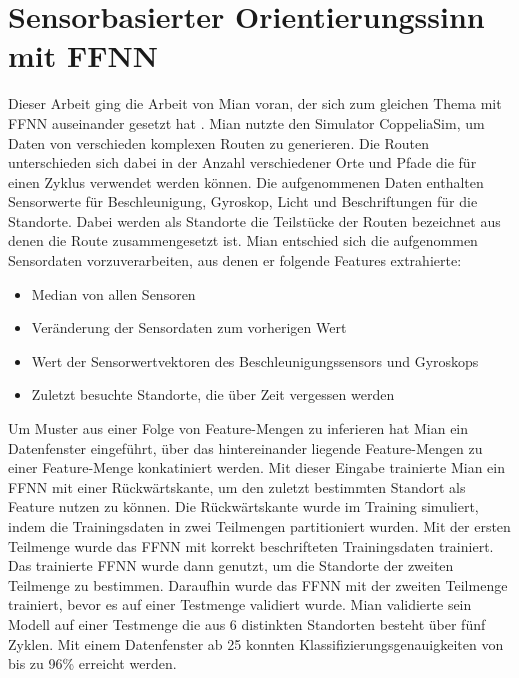 \section{Sensorbasierter Orientierungssinn mit FFNN}
Dieser Arbeit ging die Arbeit von Mian voran, der sich zum gleichen Thema mit FFNN auseinander gesetzt hat \cite{naveedThesis}.
Mian nutzte den Simulator CoppeliaSim, um Daten von verschieden komplexen Routen zu generieren.
Die Routen unterschieden sich dabei in der Anzahl verschiedener Orte und Pfade die für einen Zyklus verwendet werden können.
Die aufgenommenen Daten enthalten Sensorwerte für Beschleunigung, Gyroskop, Licht und Beschriftungen für die Standorte.
Dabei werden als Standorte die Teilstücke der Routen bezeichnet aus denen die Route zusammengesetzt ist.
\newline
\newline
Mian entschied sich die aufgenommen Sensordaten vorzuverarbeiten, aus denen er folgende Features extrahierte:
\begin{itemize}
    \item Median von allen Sensoren
    \item Veränderung der Sensordaten zum vorherigen Wert
    \item Wert der Sensorwertvektoren des Beschleunigungssensors und Gyroskops
    \item Zuletzt besuchte Standorte, die über Zeit vergessen werden
\end{itemize}
Um Muster aus einer Folge von Feature-Mengen zu inferieren hat Mian ein Datenfenster eingeführt, über das
hintereinander liegende Feature-Mengen zu einer Feature-Menge konkatiniert werden.
\newline
\newline
Mit dieser Eingabe trainierte Mian ein FFNN mit einer Rückwärtskante, um den zuletzt bestimmten Standort als Feature nutzen zu können.
Die Rückwärtskante wurde im Training simuliert, indem die Trainingsdaten in zwei Teilmengen partitioniert wurden.
Mit der ersten Teilmenge wurde das FFNN mit korrekt beschrifteten Trainingsdaten trainiert.
Das trainierte FFNN wurde dann genutzt, um die Standorte der zweiten Teilmenge zu bestimmen.
Daraufhin wurde das FFNN mit der zweiten Teilmenge trainiert, bevor es auf einer Testmenge validiert wurde.
\newline
\newline
Mian validierte sein Modell auf einer Testmenge die aus 6 distinkten Standorten besteht über fünf Zyklen.
Mit einem Datenfenster ab 25 konnten Klassifizierungsgenauigkeiten von bis zu 96\% erreicht werden.